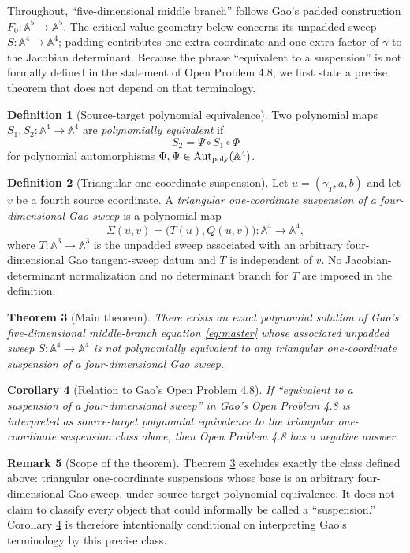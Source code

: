 \documentclass[11pt]{article}
\newtheorem{theorem}{Theorem}
\newtheorem{corollary}[theorem]{Corollary}
\theoremstyle{definition}
\newtheorem{definition}[theorem]{Definition}
\newtheorem{remark}[theorem]{Remark}
\newcommand{\A}{\mathbb A}
\begin{document}
Throughout, ``five-dimensional middle branch'' follows Gao's padded construction $F_0:\A^5\to\A^5$. The critical-value geometry below concerns its unpadded sweep $S:\A^4\to\A^4$; padding contributes one extra coordinate and one extra factor of $\gamma$ to the Jacobian determinant. Because the phrase ``equivalent to a suspension'' is not formally defined in the statement of Open Problem 4.8, we first state a precise theorem that does not depend on that terminology.

\begin{definition}[Source-target polynomial equivalence]
Two polynomial maps $S_1,S_2:\A^4\to\A^4$ are \emph{polynomially equivalent} if
\[
S_2=\Psi\circ S_1\circ\Phi
\]
for polynomial automorphisms $\Phi,\Psi\in\operatorname{Aut}_{\rm poly}(\A^4)$.
\end{definition}

\begin{definition}[Triangular one-coordinate suspension]
Let $u=(\gamma_T,a,b)$ and let $v$ be a fourth source coordinate. A \emph{triangular one-coordinate suspension of a four-dimensional Gao sweep} is a polynomial map
\[
\Sigma(u,v)=\bigl(T(u),Q(u,v)\bigr):\A^4\to\A^4,
\]
where $T:\A^3\to\A^3$ is the unpadded sweep associated with an arbitrary four-dimensional Gao tangent-sweep datum and $T$ is independent of $v$. No Jacobian-determinant normalization and no determinant branch for $T$ are imposed in the definition.
\end{definition}

\begin{theorem}[Main theorem]\label{thm:main}
There exists an exact polynomial solution of Gao's five-dimensional middle-branch equation \eqref{eq:master} whose associated unpadded sweep $S:\A^4\to\A^4$ is not polynomially equivalent to any triangular one-coordinate suspension of a four-dimensional Gao sweep.
\end{theorem}

\begin{corollary}[Relation to Gao's Open Problem 4.8]\label{cor:gao}
If ``equivalent to a suspension of a four-dimensional sweep'' in Gao's Open Problem 4.8 is interpreted as source-target polynomial equivalence to the triangular one-coordinate suspension class above, then Open Problem 4.8 has a negative answer.
\end{corollary}

\begin{remark}[Scope of the theorem]\label{rem:scope}
Theorem \ref{thm:main} excludes exactly the class defined above: triangular one-coordinate suspensions whose base is an arbitrary four-dimensional Gao sweep, under source-target polynomial equivalence.  It does not claim to classify every object that could informally be called a ``suspension.''  Corollary \ref{cor:gao} is therefore intentionally conditional on interpreting Gao's terminology by this precise class.
\end{remark}
\end{document}
